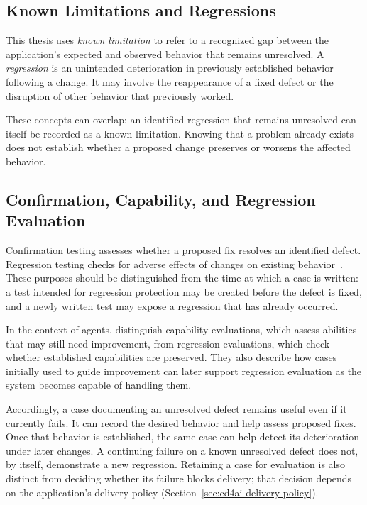 \subsection{Known Limitations and Regressions}
\label{sec:background-limitations-regressions}

This thesis uses \emph{known limitation} to refer to a recognized gap between
the application's expected and observed behavior that remains unresolved.
A \emph{regression} is an unintended deterioration in previously established
behavior following a change. It may involve the reappearance of a fixed defect
or the disruption of other behavior that previously worked.

These concepts can overlap: an identified regression that remains unresolved
can itself be recorded as a known limitation. Knowing that a problem already
exists does not establish whether a proposed change preserves or worsens the
affected behavior.

\subsection{Confirmation, Capability, and Regression Evaluation}
\label{sec:background-evaluation-purpose}

Confirmation testing assesses whether a proposed fix resolves an identified
defect. Regression testing checks for adverse effects of changes on existing
behavior~\cite[Section~2.2.3]{ISTQB:FoundationSyllabus:2024}. These purposes
should be distinguished from the time at which a case is written: a test
intended for regression protection may be created before the defect is fixed,
and a newly written test may expose a regression that has already occurred.

In the context of agents, \textcite{Grace:DemystifyingEvals:2026} distinguish
capability evaluations, which assess abilities that may still need improvement,
from regression evaluations, which check whether established capabilities are
preserved. They also describe how cases initially used to guide improvement
can later support regression evaluation as the system becomes capable of
handling them.

Accordingly, a case documenting an unresolved defect remains useful even if it
currently fails. It can record the desired behavior and help assess proposed
fixes. Once that behavior is established, the same case can help detect its
deterioration under later changes. A continuing failure on a known unresolved
defect does not, by itself, demonstrate a new regression. Retaining a case for
evaluation is also distinct from deciding whether its failure blocks delivery;
that decision depends on the application's delivery policy
(Section~\ref{sec:cd4ai-delivery-policy}).


